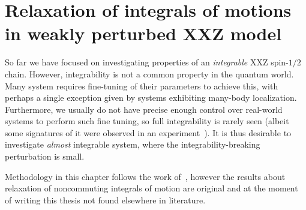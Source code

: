 \chapter{Relaxation of integrals of motions in weakly perturbed XXZ model}
\thispagestyle{chapterBeginStyle}

So far we have focused on investigating properties of an \emph{integrable} XXZ
spin-\(1/2\) chain. However, integrability is not a common property in the quantum world.
Many system requires fine-tuning of their parameters to achieve this, with perhaps a single
exception given by systems exhibiting many-body localization. Furthermore, we usually
do not have precise enough control over real-world systems to perform such fine tuning,
so full integrability is rarely seen (albeit some signatures of it were 
observed in an experiment~\autocite{Khemani2019}). It is thus desirable to investigate
 \emph{almost} integrable system, where the integrability-breaking perturbation is small.

Methodology in this chapter follows the work of~\textcite{Mierzejewski2015Approx},
however the results about relaxation of noncommuting integrals
of motion are original and at the moment of writing this thesis not found elsewhere
in literature. 
